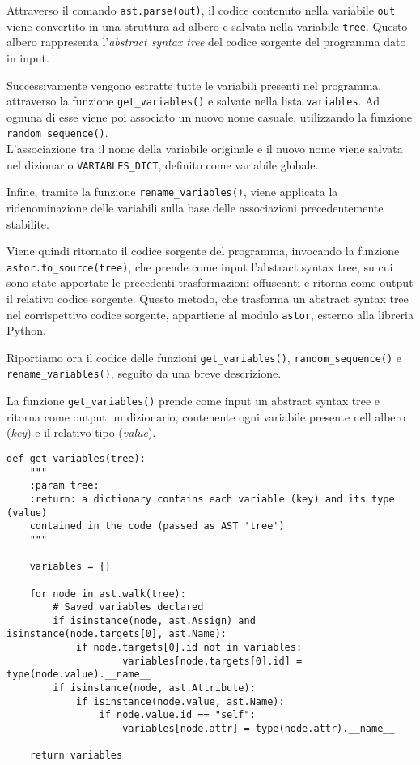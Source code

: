 \documentclass[a4paper,oneside,openright,titlepage,10pt,footinclude,headinclude]{scrbook}
\begin{document}
Attraverso il comando \texttt{ast.parse(out)}, il codice contenuto nella variabile \texttt{out} viene convertito in una struttura ad albero e salvata nella variabile \texttt{tree}. Questo albero rappresenta l'\emph{abstract syntax tree} del codice sorgente del programma dato in input.

Successivamente vengono estratte tutte le variabili presenti nel programma, attraverso la funzione \texttt{get\_variables()} e salvate nella lista \texttt{variables}. Ad ognuna di esse viene poi associato un nuovo nome casuale, utilizzando la funzione \texttt{random\_sequence()}.\\
L'associazione tra il nome della variabile originale e il nuovo nome viene salvata nel dizionario \texttt{VARIABLES\_DICT}, definito come variabile globale.

Infine, tramite la funzione \texttt{rename\_variables()}, viene applicata la ridenominazione delle variabili sulla base delle associazioni precedentemente stabilite.

Viene quindi ritornato il codice sorgente del programma, invocando la funzione  \texttt{astor.to\_source(tree)}, che prende come input l'abstract syntax tree, su cui sono state apportate le precedenti trasformazioni offuscanti e ritorna come output il relativo codice sorgente. Questo metodo, che trasforma un abstract syntax tree nel corrispettivo codice sorgente, appartiene al modulo \texttt{astor}, esterno alla libreria Python.\bigskip


Riportiamo ora il codice delle funzioni \texttt{get\_variables()}, \texttt{random\_sequence()} e \texttt{rename\_variables()}, seguito da una breve descrizione.\smallskip

La funzione \texttt{get\_variables()} prende come input un abstract syntax tree e ritorna come output un dizionario, contenente ogni variabile presente nell albero (\emph{key}) e il relativo tipo (\emph{value}).
\begin{graybox}[innerleftmargin=2,]
\begin{lstlisting}
def get_variables(tree):
    """
    :param tree:
    :return: a dictionary contains each variable (key) and its type (value) 
    contained in the code (passed as AST 'tree')
    """

    variables = {}

    for node in ast.walk(tree):
        # Saved variables declared
        if isinstance(node, ast.Assign) and isinstance(node.targets[0], ast.Name):
            if node.targets[0].id not in variables:
                    variables[node.targets[0].id] = type(node.value).__name__
        if isinstance(node, ast.Attribute):
            if isinstance(node.value, ast.Name):
                if node.value.id == "self":
                    variables[node.attr] = type(node.attr).__name__
        
    return variables
\end{lstlisting}
\end{graybox}
\end{document}
